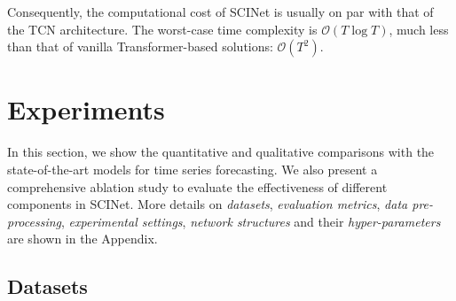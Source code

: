 \documentclass{article}
\newcommand{\red}[1]{\textcolor{red}{#1}}
\begin{document}
Consequently, the computational cost of SCINet is usually on par with that of the TCN architecture. The worst-case time complexity is $\mathcal{O}(T\log T)$, much less than that of vanilla Transformer-based solutions: $\mathcal{O}(T^2)$.



\iffalse
\subsection{Overlap-FC}

\red{Instead of using single layer of simple fully connected layer as decoder, we designed an over-lapped fully connected layer as our decoder, as shown in fig.xx. Comparing with the original FC layer, our over-lapped FC layer can bring xx\% of performance boost.
}
\fi





\section{Experiments}
\label{sec:exp}

In this section, we show the quantitative and qualitative comparisons with the state-of-the-art models for time series forecasting. We also present a comprehensive ablation study to evaluate the effectiveness of different components in SCINet. More details on \emph{datasets}, \emph{evaluation metrics}, \emph{data pre-processing}, \emph{experimental settings}, \emph{network structures} and their \emph{hyper-parameters} are shown in the Appendix.

\iffalse
In Section~\ref{sec:datasets}, we first briefly introduce the $7$ datasets on which we train the model and make comparisons with other models. 
In Section~\ref{sec:comparison_sota}, we show the quantitative and qualitative comparisons with the state-of-the-arts, and analyze the predictability of our method. 
Finally, a comprehensive ablation study is conducted in Section~\ref{sec:ab} to assess the effectiveness of different components. More details on \emph{datasets}, \emph{evaluation metrics}, \emph{data pre-processing}, \emph{experimental settings} and \emph{network structure $\&$ hyper-parameter tuning} are shown in the Appendix. \fi



\subsection{Datasets}
\label{sec:datasets}
\end{document}
